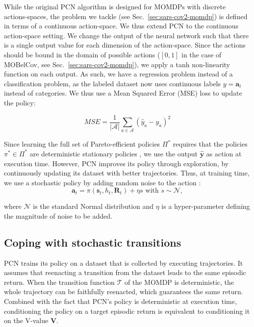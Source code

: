 \documentclass{article}
\renewcommand{\cite}[1]{\citep{#1}}
\newcommand{\mdpstate}{\mathbf{s}}
\newcommand{\momdpreturn}{\mathbf{R}}
\newcommand{\mdpaction}{\mathbf{a}}
\newcommand{\momdpname}{MOBelCov}
\begin{document}
While the original PCN algorithm is designed for MOMDPs with discrete actions-spaces, the problem we tackle (see Sec.~\ref{sec:sars-cov2-momdp}) is defined in terms of a continuous action-space. We thus extend PCN to the continuous action-space setting.
We change the output of the neural network such that there is a single output value for each dimension of the action-space. Since the actions should be bound in the domain of possible actions ($[0,1]$ in the case of \momdpname, see Sec.~\ref{sec:sars-cov2-momdp}), we apply a tanh non-linearity function on each output.
As such, we have a regression problem instead of a classification problem, as the labeled dataset now uses continuous labels $y = \mdpaction_t$ instead of categories. We thus use a Mean Squared Error (MSE) loss to update the policy:

\begin{equation}
    MSE = \frac{1}{|\mathcal{A}|}\sum_{a \in \mathcal{A}}{(\hat{y}_a - y_a)^2}
\end{equation}

Since learning the full set of Pareto-efficient policies $\Pi^*$ requires that the policies $\pi^* \in \Pi^*$ are deterministic stationary policies \cite{roijers2013survey}, we use the output $\mathbf{\hat{y}}$ as action at execution time. However, PCN improves its policy through exploration, by continuously updating its dataset with better trajectories. Thus, at training time, we use a stochastic policy by adding random noise to the action \cite{lillicrap2015continuous}: 
\begin{equation}
    \mdpaction_t = \pi(\mdpstate_t, h_t, \momdpreturn_t) + \eta s \text { with } s \sim \mathcal{N},
\end{equation}

where $\mathcal{N}$ is the standard Normal distribution and $\eta$ is a hyper-parameter defining the magnitude of noise to be added.

\subsection{Coping with stochastic transitions}
\label{sec:pcn-stochastic}

PCN trains its policy on a dataset that is collected by executing trajectories. It assumes that reenacting a transition from the dataset leads to the same episodic return. When the transition function $\mathcal{T}$ of the MOMDP is deterministic, the whole trajectory can be faithfully reenacted, which guarantees the same return. Combined with the fact that PCN's policy is deterministic at execution time, conditioning the policy on a target episodic return is equivalent to conditioning it on the V-value $\mathbf{V}$.
\end{document}
